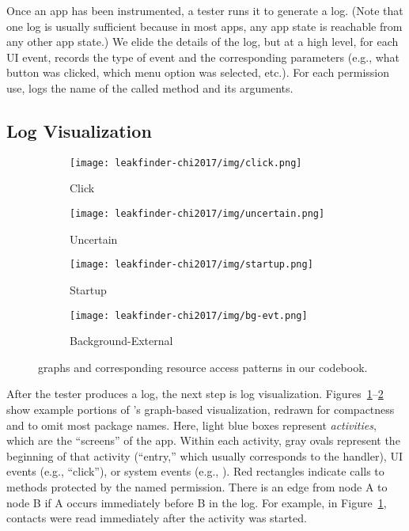 Once an app has been instrumented, a tester runs it to generate a log.
(Note that one log is usually sufficient because in most apps, any app
state is reachable from any other app state.)  We elide
the details of the log, but at a high level, for
each UI event, \apptracer{} records the type of event and the corresponding
parameters (e.g., what button was clicked, which menu option was
selected, etc.). For each permission use, \apptracer{} logs the name of
the called method and its arguments.

\subsection{Log Visualization}

\begin{figure}[tb]
  \centering
  \begin{subfigure}{.25\textwidth}
    \texttt{[image: leakfinder-chi2017/img/click.png]}
      \vspace{-.3in}
      \caption{Click}
      \label{fig:click}
  \end{subfigure}
  \begin{subfigure}{.25\textwidth}
    \vspace{-.1in}
    \texttt{[image: leakfinder-chi2017/img/uncertain.png]}
    \vspace{-.3in}
    \caption{Uncertain}
    \label{fig:uncertain}
  \end{subfigure}

  \begin{subfigure}{.25\textwidth}
    \texttt{[image: leakfinder-chi2017/img/startup.png]}
    \vspace{-.3in}
    \caption{Startup}
    \label{fig:startup}
  \end{subfigure}
  \begin{subfigure}{.25\textwidth}
    \vspace{-.1in}
    \texttt{[image: leakfinder-chi2017/img/bg-evt.png]}
    \vspace{-.3in}
    \caption{Background-External}
    \label{fig:bg-ext}
  \end{subfigure}
  \caption{\apptracer{} graphs and corresponding resource access patterns in our codebook.}
  \label{fig:leakfinder-ex-graph}
\end{figure}

After the tester produces a log, the next step is log visualization.
Figures~\ref{fig:click}--\ref{fig:uncertain} show example
portions of \apptracer{}'s graph-based visualization, redrawn for
compactness and to omit most package names.
Here, light blue boxes represent
\emph{activities}, which are the ``screens'' of the
app. Within each activity, gray ovals represent the beginning
of that activity (``entry,'' which usually corresponds to the
 handler), UI events (e.g.,
``click''), or system events (e.g.,
).
Red rectangles indicate calls to methods
protected by the named permission. There is an edge from node A to node B if A
occurs immediately before B in the log. For example, in
Figure~\ref{fig:click}, contacts were read immediately after
the  activity was started.

